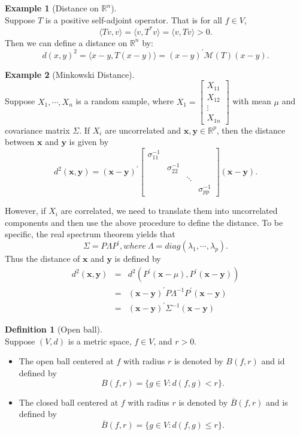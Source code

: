 \documentclass[12pt]{book}
\theoremstyle{definition}
\newtheorem{definition}{Definition}[chapter]
\newtheorem{example}{Example}[chapter]
\newcommand{\inner}[2]{{\langle #1,#2\rangle}}
\newcommand{\x}{\mathbf{x}}
\newcommand{\R}{\mathbb{R}}
\newcommand{\M}{\mathcal{M}}
\begin{document}
\begin{example}[Distance on $\R^n$] \ \\
Suppose $T$ is a positive self-adjoint operator. That is for all $f \in V$, 
$$
\inner{Tv}{v} = \inner{v}{T^* v} = \inner{v}{Tv}>0.
$$
Then we can define a distance on $\R^n$ by:
$$
d(x,y)^2 = \inner{x-y}{T(x-y)}=(x-y)^\prime \M(T) (x-y).
$$
\end{example}
\begin{example}[Minkowski Distance] \ \\ 
Suppose $X_1,\cdots,X_n$ is a random sample, where $X_1 = \begin{bmatrix}
	X_{11} \\
	X_{12} \\
	\vdots \\
	X_{1n}
\end{bmatrix}$ with mean $\mu$ and covariance matrix $\Sigma$. If $X_i$ are uncorrelated and $\x,\mathbf{y}\in \R^p$, then the distance between $\x$ and $\mathbf{y}$ is given by
$$
d^2(\x,\mathbf{y}) = (\x-\mathbf{y})^\prime \begin{bmatrix}
	\sigma_{11}^{-1} & & & \\
	 & \sigma_{22}^{-1} & & \\
	 & & \ddots & \\
	 & & & \sigma_{pp}^{-1}
\end{bmatrix} (\x-\mathbf{y}).
$$
\end{example}
However, if $X_i$ are correlated, we need to translate them into uncorrelated components and then use the above procedure to define the distance. To be specific, the real spectrum theorem yields that
$$
\Sigma = P\Lambda P^\prime , where \ \Lambda  = diag(\lambda_1,\cdots,\lambda_p).
$$
Thus the distance of $\x$ and $\mathbf{y}$ is defined by
\begin{eqnarray*}
d^2(\x,\mathbf{y}) & = &d^2(P^\prime(\x-\mu),P^\prime (\x-\mathbf{y})) \\
&=& (\x-\mathbf{y})^\prime P \Lambda^{-1}P^\prime(\x-\mathbf{y}) \\
&=& (\x-\mathbf{y})^\prime \Sigma^{-1} (\x - \mathbf{y})
\end{eqnarray*}











\begin{definition}[Open ball] \ \\
Suppose $(V,d)$ is a metric space, $f \in V$, and $r >0$.
\begin{itemize}
	\item The open ball centered at $f$ with radius $r$ is denoted by $B(f,r)$ and id defined by
	$$
	B(f,r) = \{g\in V: d(f,g) < r\}.
	$$
	\item The closed ball centered at $f$ with radius $r$ is denoted by $\overline{B}(f,r)$ and is defined by
	$$
	\overline{B}(f,r) = \{g\in V: d(f,g) \leq r\}.
	$$
\end{itemize}
\end{definition}
\end{document}
